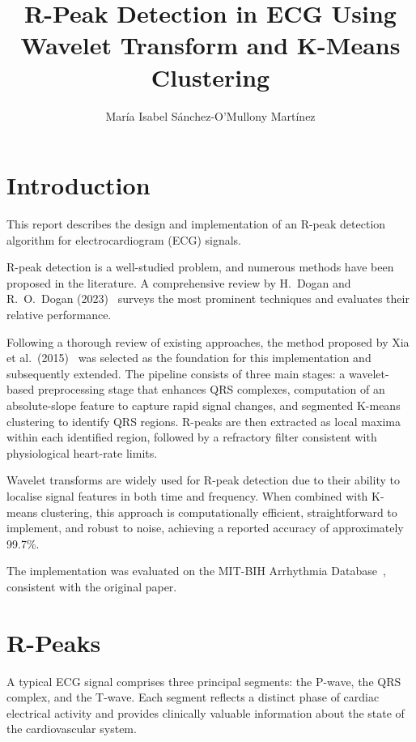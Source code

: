 \documentclass[11pt]{article}
\title{\textbf{R-Peak Detection in ECG Using Wavelet Transform and K-Means Clustering}}
\author{María Isabel Sánchez-O'Mullony Martínez}
\begin{document}
\maketitle


\section{Introduction}\label{sec:intro}
This report describes the design and implementation of an R-peak detection algorithm for electrocardiogram (ECG) signals.

R-peak detection is a well-studied problem, and numerous methods have been proposed in the literature. A comprehensive review by H.\ Dogan and R.\ O.\ Dogan (2023)~\cite{dogan_comprehensive_2023} surveys the most prominent techniques and evaluates their relative performance.

Following a thorough review of existing approaches, the method proposed by Xia et al.\ (2015)~\cite{xia_quick_2015} was selected as the foundation for this implementation and subsequently extended. The pipeline consists of three main stages: a wavelet-based preprocessing stage that enhances QRS complexes, computation of an absolute-slope feature to capture rapid signal changes, and segmented K-means clustering to identify QRS regions. R-peaks are then extracted as local maxima within each identified region, followed by a refractory filter consistent with physiological heart-rate limits.

Wavelet transforms are widely used for R-peak detection due to their ability to localise signal features in both time and frequency. When combined with K-means clustering, this approach is computationally efficient, straightforward to implement, and robust to noise, achieving a reported accuracy of approximately 99.7\%.

The implementation was evaluated on the MIT-BIH Arrhythmia Database~\cite{mitbih_physionet}, consistent with the original paper.


\section{R-Peaks}\label{sec:r-peaks}

A typical ECG signal comprises three principal segments: the P-wave, the QRS complex, and the T-wave. Each segment reflects a distinct phase of cardiac electrical activity and provides clinically valuable information about the state of the cardiovascular system.
\end{document}
